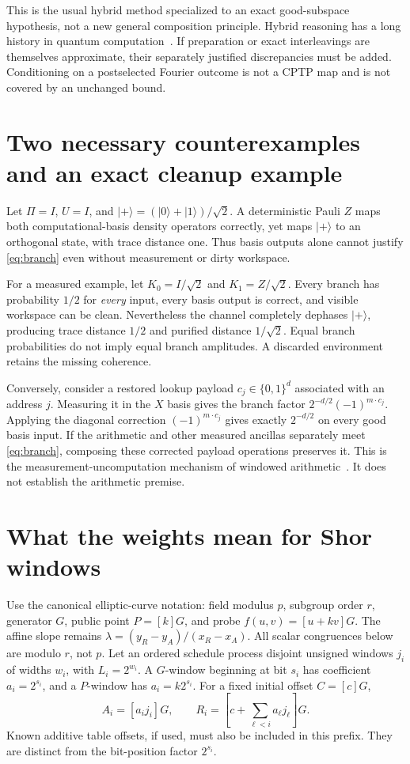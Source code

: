 \documentclass[11pt]{article}
\newcommand{\ket}[1]{\lvert #1\rangle}
\begin{document}
This is the usual hybrid method specialized to an exact good-subspace hypothesis, not a new general composition principle. Hybrid reasoning has a long history in quantum computation~\cite{bbbv}. If preparation or exact interleavings are themselves approximate, their separately justified discrepancies must be added. Conditioning on a postselected Fourier outcome is not a CPTP map and is not covered by an unchanged bound.

\section{Two necessary counterexamples and an exact cleanup example}

Let $\Pi=I$, $U=I$, and $\ket+= (\ket0+\ket1)/\sqrt2$. A deterministic Pauli $Z$ maps both computational-basis density operators correctly, yet maps $\ket+$ to an orthogonal state, with trace distance one. Thus basis outputs alone cannot justify \eqref{eq:branch} even without measurement or dirty workspace.

For a measured example, let $K_0=I/\sqrt2$ and $K_1=Z/\sqrt2$. Every branch has probability $1/2$ for \emph{every} input, every basis output is correct, and visible workspace can be clean. Nevertheless the channel completely dephases $\ket+$, producing trace distance $1/2$ and purified distance $1/\sqrt2$. Equal branch probabilities do not imply equal branch amplitudes. A discarded environment retains the missing coherence.

Conversely, consider a restored lookup payload $c_j\in\{0,1\}^d$ associated with an address $j$. Measuring it in the $X$ basis gives the branch factor $2^{-d/2}(-1)^{m\cdot c_j}$. Applying the diagonal correction $(-1)^{m\cdot c_j}$ gives exactly $2^{-d/2}$ on every good basis input. If the arithmetic and other measured ancillas separately meet \eqref{eq:branch}, composing these corrected payload operations preserves it. This is the measurement-uncomputation mechanism of windowed arithmetic~\cite{gidney}. It does not establish the arithmetic premise.

\section{What the weights mean for Shor windows}

Use the canonical elliptic-curve notation: field modulus $p$, subgroup order $r$, generator $G$, public point $P=[k]G$, and probe $f(u,v)=[u+kv]G$. The affine slope remains $\lambda=(y_R-y_A)/(x_R-x_A)$. All scalar congruences below are modulo $r$, not $p$. Let an ordered schedule process disjoint unsigned windows $j_i$ of widths $w_i$, with $L_i=2^{w_i}$. A $G$-window beginning at bit $s_i$ has coefficient $a_i=2^{s_i}$, and a $P$-window has $a_i=k2^{s_i}$. For a fixed initial offset $C=[c]G$,
\begin{equation}
 A_i=[a_i j_i]G,\qquad
 R_i=\left[c+\sum_{\ell<i}a_\ell j_\ell\right]G.
 \label{eq:prefix-point}
\end{equation}
Known additive table offsets, if used, must also be included in this prefix. They are distinct from the bit-position factor $2^{s_i}$.
\end{document}
